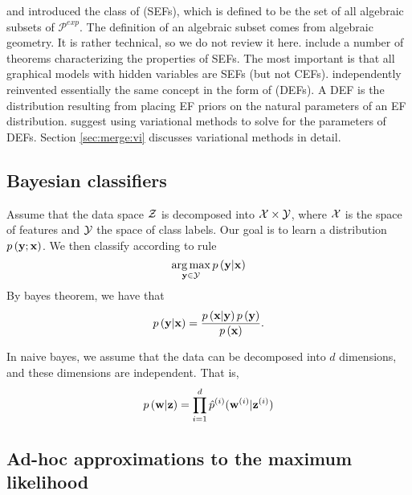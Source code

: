 \documentclass[thesis.tex]{subfiles}
\newcommand{\p}[1]{p\left({#1}\right)}
\newcommand{\psup}[2]{\hat p^{#1}({#2})}
\newcommand{\Pdist}{\mathcal P}
\newcommand{\Pexp}{\Pdist^\textit{exp}}
\begin{document}
\cite{geiger1998graphical} and \citet{geiger2001stratified} introduced the class of  (SEFs),
which is defined to be the set of all algebraic subsets of $\Pexp$.
The definition of an algebraic subset comes from algebraic geometry.
It is rather technical, so we do not review it here.
\citet{geiger2001stratified} include a number of theorems characterizing the properties of SEFs.
The most important is that all graphical models with hidden variables are SEFs (but not CEFs).
\cite{ranganath2015deep} independently reinvented essentially the same concept in the form of  (DEFs).
A DEF is the distribution resulting from placing EF priors on the natural parameters of an EF distribution.
\citet{ranganath2015deep} suggest using variational methods to solve for the parameters of DEFs.
Section \ref{sec:merge:vi} discusses variational methods in detail.


\subsection{Bayesian classifiers}

Assume that the data space ${\mathcal Z}$ is decomposed into ${\mathcal X}\times {\mathcal Y}$,
where ${\mathcal X}$ is the space of features and ${\mathcal Y}$ the space of class labels.
Our goal is to learn a distribution $\p{\y ; \x}$.
We then classify according to rule
\begin{equation}
    \argmax_{\y\in\Y} \p{\y | \x}
    \end{equation}
By bayes theorem, we have that
\begin{equation}
    \p{\y | \x} = \frac{\p{\x | \y}\p{\y}}{\p{\x}}
    .
\end{equation}

In naive bayes, we assume that the data can be decomposed into $d$ dimensions,
and these dimensions are independent.
That is,
\begin{equation}
    \p{\w | \z} = \prod_{i=1}^d \psup{(i)}{\w^{(i)} | \z^{(i)}}
\end{equation}



\subsection{Ad-hoc approximations to the maximum likelihood}
\end{document}
